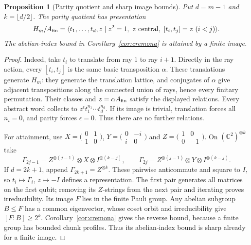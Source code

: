 \documentclass[11pt,a4paper]{article}
\theoremstyle{plain}
\newtheorem{proposition}[theorem]{Proposition}
\theoremstyle{definition}
\theoremstyle{remark}
\begin{document}
\begin{proposition}[Parity quotient and sharp image bounds]\label{rem:sharp-images}
Put $d=m-1$ and $k=\lfloor d/2\rfloor$. The parity quotient has presentation
\[
H_m/A_{\rm fin}=\langle t_1,\ldots,t_d,z\mid z^2=1,\ z\text{ central},\ [t_i,t_j]=z\ (i<j)\rangle.
\]
The abelian-index bound in Corollary~\ref{cor:cremona} is attained by a finite image.
\end{proposition}
\begin{proof}
Indeed, take $t_i$ to translate from ray $1$ to ray $i+1$. Directly in the ray action, every $[t_i,t_j]$ is the same basic transposition
$\alpha$. These translations generate $H_m$: they generate the translation lattice, and conjugates of $\alpha$ give adjacent
transpositions along the connected union of rays, hence every finitary permutation. Their classes and $z=\alpha A_{\rm fin}$ satisfy
the displayed relations. Every abstract word collects to $z^\epsilon t_1^{n_1}\cdots t_d^{n_d}$. If its image is trivial, translation forces
all $n_i=0$, and parity forces $\epsilon=0$. Thus there are no further relations.

For attainment, use $X=\bigl(\begin{smallmatrix}0&1\\1&0\end{smallmatrix}\bigr)$,
$Y=\bigl(\begin{smallmatrix}0&-i\\i&0\end{smallmatrix}\bigr)$ and
$Z=\bigl(\begin{smallmatrix}1&0\\0&-1\end{smallmatrix}\bigr)$. On $(\mathbb C^2)^{\otimes k}$ take
\[
\Gamma_{2j-1}=Z^{\otimes(j-1)}\otimes X\otimes I^{\otimes(k-j)},\qquad
\Gamma_{2j}=Z^{\otimes(j-1)}\otimes Y\otimes I^{\otimes(k-j)}.
\]
If $d=2k+1$, append $\Gamma_{2k+1}=Z^{\otimes k}$. These pairwise anticommute and square to $I$, so $t_i\mapsto\Gamma_i$, $z\mapsto-I$
defines a representation. The first pair generates all matrices on the first qubit; removing its $Z$-strings from the next pair and
iterating proves irreducibility. Its image $F$ lies in the finite Pauli group. Any abelian subgroup $B\le F$ has a common eigenvector,
whose coset orbit and irreducibility give $[F:B]\ge2^k$. Corollary~\ref{cor:cremona} gives the reverse bound, because a finite group has
bounded chunk profiles. Thus its abelian-index bound is sharp already for a finite image.
\end{proof}
\end{document}
